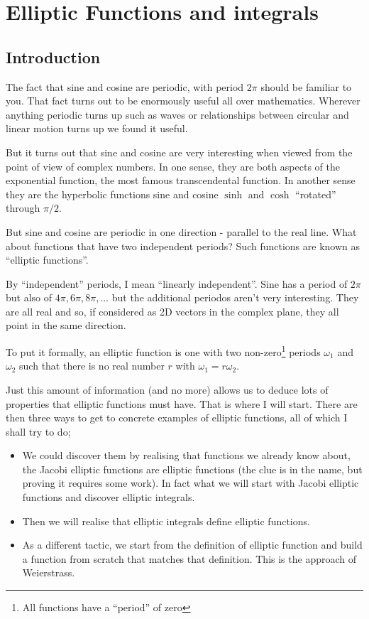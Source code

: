 \documentclass[main.tex]{subfiles}
\begin{document}
\chapter{Elliptic Functions and integrals}
\section{Introduction}

The fact that sine and cosine are periodic, with period $2\pi$ should be familiar to you. That fact turns out to be enormously useful all over mathematics. Wherever anything periodic turns up such as waves or relationships between circular and linear motion turns up we found it useful. 

But it turns out that sine and cosine are very interesting when viewed from the point of view of complex numbers. In one sense, they are both aspects of the exponential function, the most famous transcendental function. In another sense they are the hyperbolic functions sine and cosine $\sinh$ and $\cosh$ ``rotated'' through $\pi/2$.

But sine and cosine are periodic in one direction - parallel to the real line. What about functions that have two independent periods? Such functions are known as ``elliptic functions''.

By ``independent'' periods, I mean ``linearly independent''. Sine has a period of $2\pi$ but also of $4\pi, 6\pi, 8\pi, \ldots$ but the additional periodos aren't very interesting. They are all real and so, if considered as 2D vectors in the complex plane, they all point in the same direction. 

To put it formally, an elliptic function is one with two non-zero\footnote{All functions have a ``period'' of zero} periods $\omega_1$ and $\omega_2$ such that there is no real number $r$ with $\omega_1=r\omega_2$. 

Just this amount of information (and no more) allows us to deduce lots of properties that elliptic functions must have. That is where I will start. There are then three ways to get to concrete examples of elliptic functions, all of which I shall try to do;

\begin{itemize}
\item We could discover them by realising that functions we already know about, the Jacobi elliptic functions are elliptic functions (the clue is in the name, but proving it requires some work). In fact what we will start with Jacobi elliptic functions and discover elliptic integrals.
\item Then we will realise that elliptic integrals define elliptic functions.
\item As a different tactic, we start from the definition of elliptic function and build a function from scratch that matches that definition. This is the approach of Weierstrass.
\end{itemize}
\end{document}
